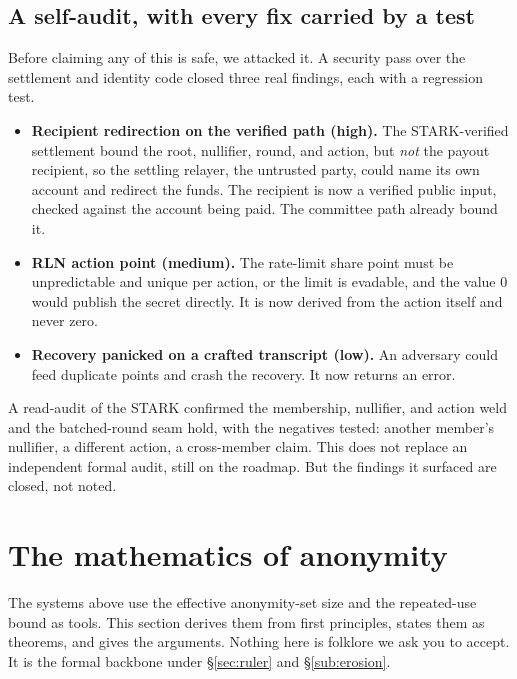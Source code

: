 \documentclass[11pt]{article}
\begin{document}
\subsection{A self-audit, with every fix carried by a test}
\label{sub:selfaudit}

Before claiming any of this is safe, we attacked it. A security pass over the settlement
and identity code closed three real findings, each with a regression test.

\begin{itemize}[leftmargin=1.4em,itemsep=0.15em]
\item \textbf{Recipient redirection on the verified path (high).} The STARK-verified
      settlement bound the root, nullifier, round, and action, but \emph{not} the payout
      recipient, so the settling relayer, the untrusted party, could name its own account
      and redirect the funds. The recipient is now a verified public input, checked
      against the account being paid. The committee path already bound it.
\item \textbf{RLN action point (medium).} The rate-limit share point must be
      unpredictable and unique per action, or the limit is evadable, and the value $0$
      would publish the secret directly. It is now derived from the action itself and
      never zero.
\item \textbf{Recovery panicked on a crafted transcript (low).} An adversary could feed
      duplicate points and crash the recovery. It now returns an error.
\end{itemize}

A read-audit of the STARK confirmed the membership, nullifier, and action weld and the
batched-round seam hold, with the negatives tested: another member's nullifier, a
different action, a cross-member claim. This does not replace an independent formal
audit, still on the roadmap. But the findings it surfaced are closed, not noted.

\section{The mathematics of anonymity}
\label{sec:math-anon}

The systems above use the effective anonymity-set size and the repeated-use bound as
tools. This section derives them from first principles, states them as theorems, and
gives the arguments. Nothing here is folklore we ask you to accept. It is the formal
backbone under \S\ref{sec:ruler} and \S\ref{sub:erosion}.
\end{document}

